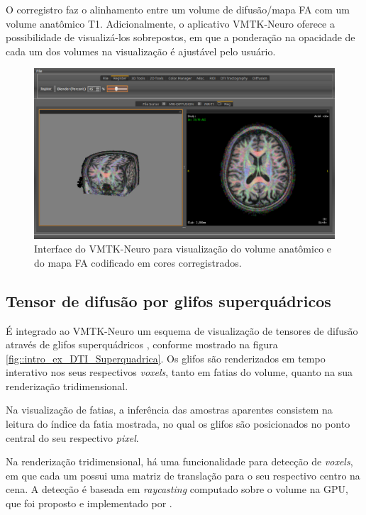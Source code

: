 \documentclass[
    12pt,                %
    oneside,            %
    a4paper,            %
    english,            %
    french,                %
    spanish,            %
    brazil                %
    ]{abntex2}
\begin{document}
O corregistro faz o alinhamento entre um volume de difusão/mapa FA com um volume anatômico T1. Adicionalmente, o aplicativo VMTK-Neuro oferece a possibilidade de visualizá-los sobrepostos, em que a ponderação na opacidade de cada um dos volumes na visualização é ajustável pelo usuário.

\begin{figure}[H]
\centering
\includegraphics[scale = 0.3]{figs/Exemplo_Trabalhos_Relacionados/corregistro.png}
\caption{Interface do VMTK-Neuro para visualização do volume anatômico e do mapa FA codificado em cores corregistrados.}
\label{corregistroFAT1}
\end{figure}

\subsection{Tensor de difusão por glifos superquádricos}
\label{ssec::supequadricos}

É integrado ao VMTK-Neuro um esquema de visualização de tensores de difusão através de glifos superquádricos \cite{Kindlmann2004}, conforme mostrado na figura \ref{fig::intro_ex_DTI_Superquadrica}. Os glifos são renderizados em tempo interativo nos seus respectivos \textit{voxels}, tanto em fatias do volume, quanto na sua renderização tridimensional.

Na visualização de fatias, a inferência das amostras aparentes consistem na leitura do índice da fatia mostrada, no qual os glifos são posicionados no ponto central do seu respectivo \textit{pixel}.

Na renderização tridimensional, há uma funcionalidade para detecção de \textit{voxels}, em que cada um possui uma matriz de translação para o seu respectivo centro na cena. A detecção é baseada em \textit{raycasting} computado sobre o volume na GPU, que foi proposto e implementado por .
\end{document}
